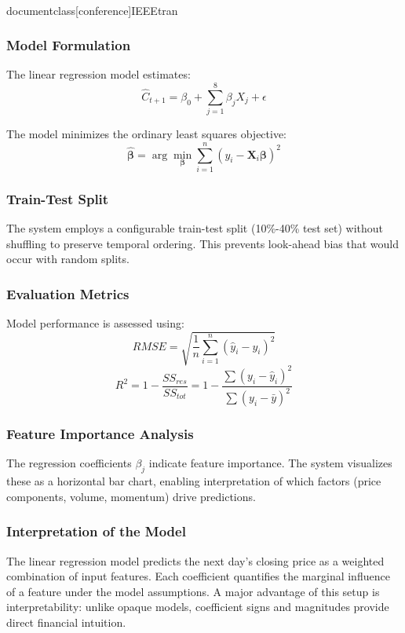 \\documentclass[conference]{IEEEtran}
\begin{document}
\subsubsection{Model Formulation}
The linear regression model estimates:
\begin{equation}
    \hat{C}_{t+1} = \beta_0 + \sum_{j=1}^{8} \beta_j X_j + \epsilon
\end{equation}

The model minimizes the ordinary least squares objective:
\begin{equation}
    \hat{\boldsymbol{\beta}} = \arg\min_{\boldsymbol{\beta}} \sum_{i=1}^{n}(y_i - \mathbf{X}_i\boldsymbol{\beta})^2
\end{equation}

\subsubsection{Train-Test Split}
The system employs a configurable train-test split (10\%-40\% test set) without shuffling to preserve temporal ordering. This prevents look-ahead bias that would occur with random splits.

\subsubsection{Evaluation Metrics}
Model performance is assessed using:
\begin{equation}
    RMSE = \sqrt{\frac{1}{n}\sum_{i=1}^{n}(\hat{y}_i - y_i)^2}
\end{equation}
\begin{equation}
    R^2 = 1 - \frac{SS_{res}}{SS_{tot}} = 1 - \frac{\sum(y_i - \hat{y}_i)^2}{\sum(y_i - \bar{y})^2}
\end{equation}

\subsubsection{Feature Importance Analysis}
The regression coefficients $\beta_j$ indicate feature importance. The system visualizes these as a horizontal bar chart, enabling interpretation of which factors (price components, volume, momentum) drive predictions.

\subsubsection{Interpretation of the Model}
The linear regression model predicts the next day's closing price as a weighted combination of input features. Each coefficient quantifies the marginal influence of a feature under the model assumptions. A major advantage of this setup is interpretability: unlike opaque models, coefficient signs and magnitudes provide direct financial intuition.
\end{document}
